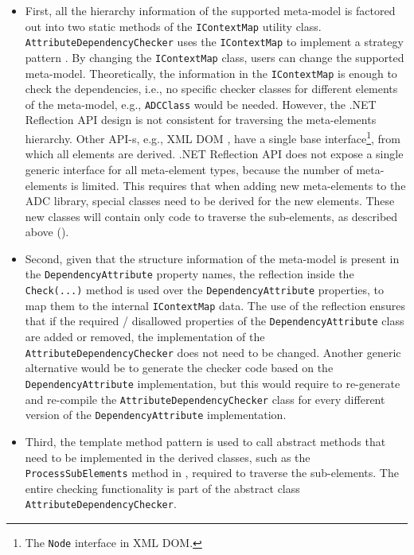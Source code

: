 \begin{itemize}

\item First, all the hierarchy information of the supported meta-model is factored out into two static methods of the \texttt{ICon\-text\-Map} utility class. \texttt{Attri\-bu\-te\-De\-pe\-nden\-cy\-Che\-cker} uses the \texttt{ICon\-text\-Map} to implement a strategy pattern \cite{dpatterns}. By changing the \texttt{ICon\-text\-Map} class, users can change the supported meta-model. Theoretically, the information in the \texttt{ICon\-text\-Map} is enough to check the dependencies, i.e., no specific checker classes for different elements of the meta-model, e.g., \texttt{ADC\-Class} would be needed. However, the .NET Reflection API design is not consistent for traversing the meta-elements hierarchy. Other API-s, e.g., XML DOM \cite{mcl.01}, have a single base interface\footnote{The \texttt{Node} interface in XML DOM.}, from which all elements are derived. .NET Reflection API does not expose a single generic interface for all meta-element types, because the number of meta-elements is limited. This requires that when adding new meta-elements to the ADC library, special classes need to be derived for the new elements. These new classes will contain only code to traverse the sub-elements, as described above ().

\item Second, given that the structure information of the meta-model is present in the \texttt{De\-penden\-cyAttri\-bute} property names, the reflection inside the \texttt{Check(...)} method is used over the \texttt{De\-pende\-ncyAttri\-bute} properties, to map them to the internal \texttt{ICon\-text\-Map} data. The use of the reflection ensures that if the required / disallowed properties of the \texttt{Depe\-nde\-ncy\-Attri\-bute} class are added or removed, the implementation of the \texttt{Attri\-buteDepen\-dencyChe\-cker} does not need to be changed. Another generic alternative would be to generate the checker code based on the \texttt{Depen\-dency\-Attri\-bute} implementation, but this would require to re-generate and re-compile the \texttt{Attri\-buteDepen\-dencyChe\-cker} class for every different version of the \texttt{Depen\-dency\-Attri\-bute} implementation.

\item Third, the template method pattern \cite{dpatterns} is used to call abstract methods that need to be implemented in the derived classes, such as the \texttt{Proce\-ssSubEle\-ments} method in , required to traverse the sub-elements. The entire checking functionality is part of the abstract class \texttt{Attri\-buteDe\-pende\-ncyChe\-cker}.

\end{itemize}

